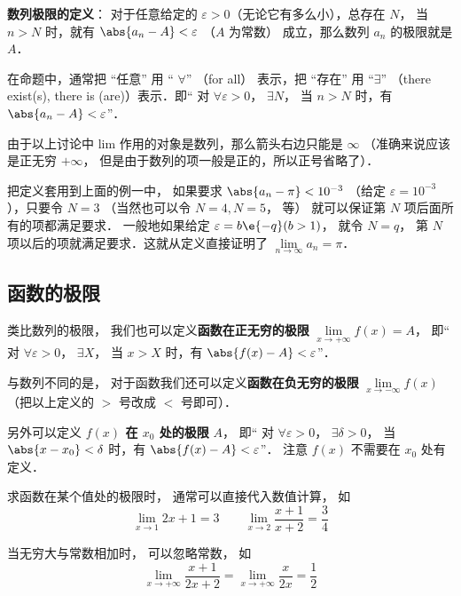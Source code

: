 \textbf{数列极限的定义}： 对于任意给定的 $\varepsilon > 0$（无论它有多么小），总存在 $N$， 当 $n>N$ 时，就有 $\abs{a_n - A} < \varepsilon$ （$A$ 为常数） 成立，那么数列 $a_n$ 的极限就是 $A$． 

在命题中，通常把 “任意” 用 “ $\forall$” （for all） 表示，把 “存在” 用 “$\exists $” （there exist(s), there is (are)）表示．即“ 对 $\forall \varepsilon>0$， $\exists N$， 当 $n>N$ 时，有 $\abs{a_n - A} < \varepsilon$”． 

由于以上讨论中 lim 作用的对象是数列，那么箭头右边只能是 $\infty$ （准确来说应该是正无穷 $+\infty$， 但是由于数列的项一般是正的，所以正号省略了）．

把定义套用到上面的例一中， 如果要求 $\abs{a_n - \pi} < 10^{-3}$ （给定 $\varepsilon  = 10^{-3}$），只要令 $N=3$ （当然也可以令 $N=4, N=5$， 等） 就可以保证第 $N$ 项后面所有的项都满足要求． 一般地如果给定 $\varepsilon  = b\e{-q}  (b > 1)$， 就令 $N = q$， 第 $N$ 项以后的项就满足要求．这就从定义直接证明了 $\lim\limits_{n \to \infty } a_n = \pi$． 

\subsection{函数的极限}
类比数列的极限， 我们也可以定义\textbf{函数在正无穷的极限} $\lim\limits_{x\to +\infty} f(x) = A$， 即“ 对 $\forall \varepsilon > 0$， $\exists X$， 当 $x>X$ 时，有 $\abs{f(x) - A} < \varepsilon$”．

与数列不同的是， 对于函数我们还可以定义\textbf{函数在负无穷的极限} $\lim\limits_{x\to -\infty} f(x)$（把以上定义的 $>$ 号改成 $<$ 号即可）．

另外可以定义 \textbf{$f(x)$ 在 $x_0$ 处的极限} $A$， 即“ 对 $\forall \varepsilon > 0$， $\exists \delta > 0$， 当 $\abs{x - x_0} < \delta$ 时，有 $\abs{f(x) - A} < \varepsilon$”． 注意 $f(x)$ 不需要在 $x_0$ 处有定义．

\begin{example}{}
求函数在某个值处的极限时， 通常可以直接代入数值计算， 如
\begin{equation}
\lim_{x\to 1} 2x + 1 = 3 \qquad \lim_{x\to 2}\frac{x + 1}{x + 2} = \frac34
\end{equation}

当无穷大与常数相加时， 可以忽略常数， 如
\begin{equation}
\lim_{x\to +\infty} \frac{x + 1}{2x + 2} = \lim_{x\to +\infty} \frac{x}{2x} = \frac12
\end{equation}
\end{example}

